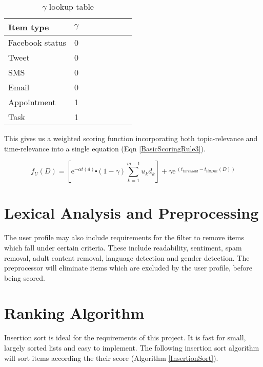 \begin{table}\label{BetaLookup}
\begin{center}
	\begin{tabular}{l*{6}{c}r}
		Item type        & $\gamma$ \\
		\hline
		Facebook status  & 0 \\
		Tweet            & 0 \\
		SMS          	 & 0 \\
		Email    		 & 0 \\
		Appointment      & 1 \\
		Task		     & 1 \\
	\end{tabular}
	\caption{$\gamma$ lookup table}
\end{center}
\end{table}

This gives us a weighted scoring function incorporating both topic-relevance and time-relevance into a single equation (Eqn \ref{BasicScoringRule3}).

\begin{equation}\label{BasicScoringRule3}
	f_U (D) = \left[{\mathrm{e}}^{-\alpha t(d)} \centerdot (1-\gamma) \sum_{k=1}^{m-1} u_kd_k \right] + \gamma{\mathrm{e}}^{\ (t_{threshold}-t_{tillDue}(D))}
\end{equation}

\section{Lexical Analysis and Preprocessing}

The user profile may also include requirements for the filter to remove items which fall under certain criteria. These include readability, sentiment, spam removal, adult content removal, language detection and gender detection. The preprocessor will eliminate items which are excluded by the user profile, before being scored. 

\section{Ranking Algorithm}

Insertion sort is ideal for the requirements of this project. It is fast for small, largely sorted lists and easy to implement. The following insertion sort algorithm will sort items according the their score (Algorithm \ref{InsertionSort}).

